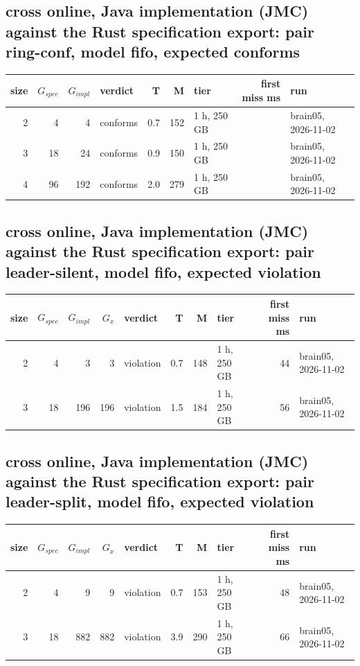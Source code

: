 \documentclass[10pt]{article}
\begin{document}
\subsection*{cross online, Java implementation (JMC) against the Rust specification export: pair \textsf{ring-conf}, model fifo, expected conforms}
\begin{longtable}{@{}rrrlrrlrl@{}}
\toprule
size & $G_{\mathit{spec}}$ & $G_{\mathit{impl}}$ & verdict & T & M & tier & first miss ms & run \\
\midrule
\endhead
\color{red} 2 & 4 & 4 & conforms & 0.7 & 152 & 1 h, 250 GB &  & brain05, 2026-11-02 \\
\color{red} 3 & 18 & 24 & conforms & 0.9 & 150 & 1 h, 250 GB &  & brain05, 2026-11-02 \\
\color{red} 4 & 96 & 192 & conforms & 2.0 & 279 & 1 h, 250 GB &  & brain05, 2026-11-02 \\
\bottomrule
\end{longtable}
\subsection*{cross online, Java implementation (JMC) against the Rust specification export: pair \textsf{leader-silent}, model fifo, expected violation}
\begin{longtable}{@{}rrrrlrrlrl@{}}
\toprule
size & $G_{\mathit{spec}}$ & $G_{\mathit{impl}}$ & $G_x$ & verdict & T & M & tier & first miss ms & run \\
\midrule
\endhead
\color{red} 2 & 4 & 3 & 3 & violation & 0.7 & 148 & 1 h, 250 GB & 44 & brain05, 2026-11-02 \\
\color{red} 3 & 18 & 196 & 196 & violation & 1.5 & 184 & 1 h, 250 GB & 56 & brain05, 2026-11-02 \\
\bottomrule
\end{longtable}
\subsection*{cross online, Java implementation (JMC) against the Rust specification export: pair \textsf{leader-split}, model fifo, expected violation}
\begin{longtable}{@{}rrrrlrrlrl@{}}
\toprule
size & $G_{\mathit{spec}}$ & $G_{\mathit{impl}}$ & $G_x$ & verdict & T & M & tier & first miss ms & run \\
\midrule
\endhead
\color{red} 2 & 4 & 9 & 9 & violation & 0.7 & 153 & 1 h, 250 GB & 48 & brain05, 2026-11-02 \\
\color{red} 3 & 18 & 882 & 882 & violation & 3.9 & 290 & 1 h, 250 GB & 66 & brain05, 2026-11-02 \\
\bottomrule
\end{longtable}
\end{document}

